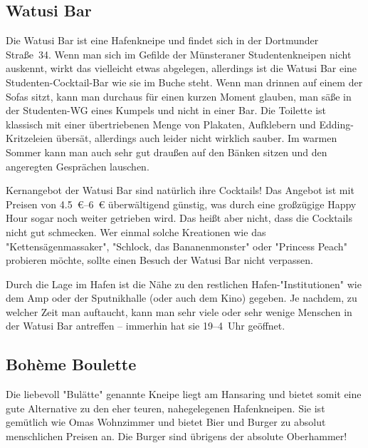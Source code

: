{\begin{multicols*}{2}
\begin{center}
\end{center}

\subsection{Watusi Bar}
Die Watusi Bar ist eine Hafenkneipe und findet sich in der Dortmunder Straße~34.
Wenn man sich im Gefilde der Münsteraner Studentenkneipen nicht auskennt, wirkt das vielleicht etwas abgelegen, allerdings ist die Watusi Bar eine Studenten-Cocktail-Bar wie sie im Buche steht.
Wenn man drinnen auf einem der Sofas sitzt, kann man durchaus für einen kurzen Moment glauben, man säße in der Studenten-WG eines Kumpels und nicht in einer Bar.
Die Toilette ist klassisch mit einer übertriebenen Menge von Plakaten, Aufklebern und Edding-Kritzeleien übersät, allerdings auch leider nicht wirklich sauber.
Im warmen Sommer kann man auch sehr gut draußen auf den Bänken sitzen und den angeregten Gesprächen lauschen.

Kernangebot der Watusi Bar sind natürlich ihre Cocktails!
Das Angebot ist mit Preisen von \SIrange{4,5}{6}{\euro} überwältigend günstig, was durch eine großzügige Happy Hour sogar noch weiter getrieben wird.
Das heißt aber nicht, dass die Cocktails nicht gut schmecken.
Wer einmal solche Kreationen wie das "Kettensägenmassaker", "Schlock, das Bananenmonster" oder "Princess Peach" probieren möchte, sollte einen Besuch der Watusi Bar nicht verpassen.

Durch die Lage im Hafen ist die Nähe zu den restlichen Hafen-"Institutionen" wie dem Amp oder der Sputnikhalle (oder auch dem Kino) gegeben.
Je nachdem, zu welcher Zeit man auftaucht, kann man sehr viele oder sehr wenige Menschen in der Watusi Bar antreffen -- immerhin hat sie 19--4~Uhr geöffnet.

\begin{center}
\end{center}

\subsection{Bohème Boulette}
Die liebevoll "Bulätte" genannte Kneipe liegt am Hansaring und bietet somit eine gute Alternative zu den eher teuren, nahegelegenen Hafenkneipen.
Sie ist gemütlich wie Omas Wohnzimmer und bietet Bier und Burger zu absolut menschlichen Preisen an.
Die Burger sind übrigens der absolute Oberhammer!


\end{multicols*}}
